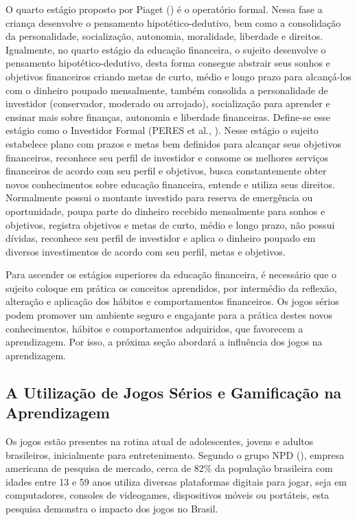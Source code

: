 O quarto estágio proposto por Piaget (\citeyear{piaget1971}) é o operatório formal. Nessa fase a criança desenvolve o pensamento hipotético-dedutivo, bem como a consolidação da personalidade, socialização, autonomia, moralidade, liberdade e direitos. Igualmente, no quarto estágio da educação financeira, o sujeito desenvolve o pensamento hipotético-dedutivo, desta forma consegue abstrair seus sonhos e objetivos financeiros criando metas de curto, médio e longo prazo para alcançá-los com o dinheiro poupado mensalmente, também consolida a personalidade de investidor (conservador, moderado ou arrojado), socialização para aprender e ensinar mais sobre finanças, autonomia e liberdade financeiras. Define-se esse estágio como o Investidor Formal (PERES et al., \citeyear{peres2019}). Nesse estágio o sujeito estabelece plano com prazos e metas bem definidos para alcançar seus objetivos financeiros, reconhece seu perfil de investidor e consome os melhores serviços financeiros de acordo com seu perfil e objetivos, busca constantemente obter novos conhecimentos sobre educação financeira, entende e utiliza seus direitos. Normalmente possui o montante investido para reserva de emergência ou oportunidade, poupa parte do dinheiro recebido mensalmente para sonhos e objetivos, registra objetivos e metas de curto, médio e longo prazo, não possui dívidas, reconhece seu perfil de investidor e aplica o dinheiro poupado em diversos investimentos de acordo com seu perfil, metas e objetivos.

Para ascender os estágios superiores da educação financeira, é necessário que o sujeito coloque em prática os conceitos aprendidos, por intermédio da reflexão, alteração e aplicação dos hábitos e comportamentos financeiros. Os jogos sérios podem promover um ambiente seguro e engajante para a prática destes novos conhecimentos, hábitos e comportamentos adquiridos, que favorecem a aprendizagem. Por isso, a próxima seção abordará a influência dos jogos na aprendizagem.

\subsection{A Utilização de Jogos Sérios e Gamificação na Aprendizagem}
Os jogos estão presentes na rotina atual de adolescentes, jovens e adultos brasileiros, inicialmente para entretenimento. Segundo o grupo NPD (\citeyear{npd2015}), empresa americana de pesquisa de mercado, cerca de 82{\%} da população brasileira com idades entre 13 e 59 anos utiliza diversas plataformas digitais para jogar, seja em computadores, consoles de videogames, dispositivos móveis ou portáteis, esta pesquisa demonstra o impacto dos jogos no Brasil.

